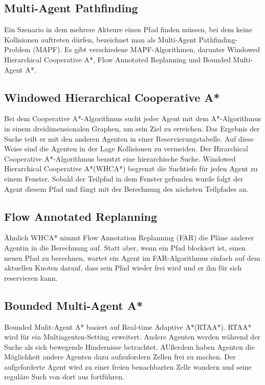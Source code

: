 \subsection{Multi-Agent Pathfinding}

Ein Szenario in dem mehrere Akteure einen Pfad finden müssen, bei dem keine Kollisionen auftreten dürfen, bezeichnet man als Multi-Agent Pathfinding-Problem (MAPF). Es gibt verschiedene MAPF-Algorithmen, darunter Windowed Hierarchical Cooperative A*, Flow Annotated Replanning und Bounded Multi-Agent A*.

\subsection{Windowed Hierarchical Cooperative A*}
Bei dem Cooperative A*-Algorithmus sucht jeder Agent mit dem A*-Algorithmus in einem dreidimensionalen Graphen, um sein Ziel zu erreichen. Das Ergebnis der Suche teilt er mit den anderen Agenten in einer Reservierungstabelle. Auf diese Weise sind die Agenten in der Lage Kollisionen zu vermeiden. Der Hirarchical Cooperative A*-Algorithmus benutzt eine hierarchische Suche. Windowed Hierarchical Cooperative A*(WHCA*) begrenzt die Suchtiefe für jeden Agent zu einem Fenster. Sobald der Teilpfad in dem Fenster gefunden wurde folgt der Agent diesem Pfad und fängt mit der Berechnung des nächsten Teilpfades an. 
\subsection{Flow Annotated Replanning}
Ähnlich WHCA* nimmt Flow Annotation Replanning (FAR) die Pläne anderer Agentin in die Berechnung auf. Statt aber, wenn ein Pfad blockiert ist, einen neuen Pfad zu berechnen, wartet ein Agent im FAR-Algorithmus einfach auf dem aktuellen Knoten darauf, dass sein Pfad wieder frei wird und er ihn für sich reservieren kann. 

\subsection{Bounded Multi-Agent A*}
Bounded Mulit-Agent A* basiert auf Real-time Adaptive A*(RTAA*). RTAA* wird für ein Multiagenten-Setting erweitert. Andere Agenten werden während der Suche als sich bewegende Hindernisse betrachtet. AUßerdem haben Agenten die Möglichkeit andere Agenten dazu aufzufordern Zellen frei zu machen. Der aufgeforderte Agent wird zu einer freien benachbarten Zelle wandern und seine reguläre Such von dort aus fortführen\cite{Sigurdson.2019}.
